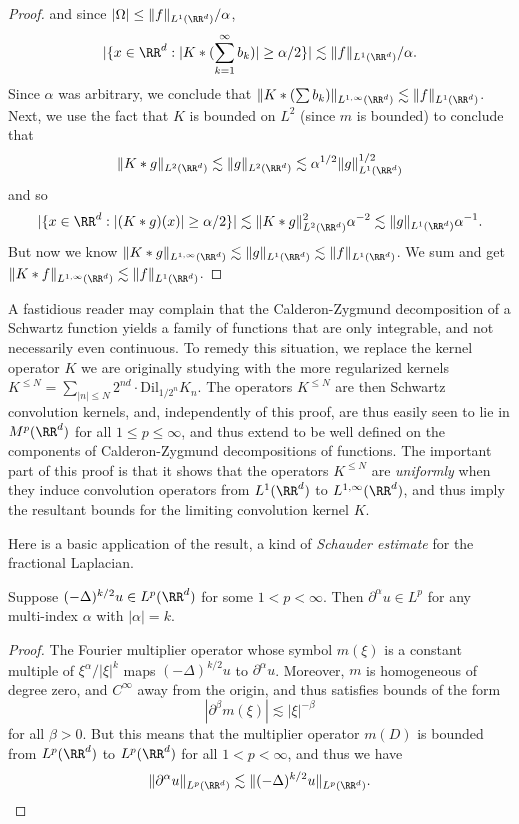 \begin{proof}
  and since $|\Omega| \leq \| f \|_{L^1(\RR^d)} / \alpha$,
  \[ |\{ x \in \RR^d : |K * (\sum_{k = 1}^\infty b_k)| \geq \alpha/2 \}| \lesssim \| f \|_{L^1(\RR^d)} / \alpha. \]
  Since $\alpha$ was arbitrary, we conclude that $\| K * (\sum b_k) \|_{L^{1,\infty}(\RR^d)} \lesssim \| f \|_{L^1(\RR^d)}$. Next, we use the fact that $K$ is bounded on $L^2$ (since $m$ is bounded) to conclude that
  \[ \| K * g \|_{L^2(\RR^d)} \lesssim \| g \|_{L^2(\RR^d)} \lesssim \alpha^{1/2} \| g \|_{L^1(\RR^d)}^{1/2} \]
  and so
  \[ |\{ x \in \RR^d: |(K * g)(x)| \geq \alpha / 2 \}| \lesssim \| K * g \|_{L^2(\RR^d)}^2 \alpha^{-2} \lesssim \| g \|_{L^1(\RR^d)} \alpha^{-1}. \]
  But now we know $\| K * g \|_{L^{1,\infty}(\RR^d)} \lesssim \| g \|_{L^1(\RR^d)} \lesssim \| f \|_{L^1(\RR^d)}$. We sum and get $\| K * f \|_{L^{1,\infty}(\RR^d)} \lesssim \| f \|_{L^1(\RR^d)}$.
\end{proof}

\begin{remark}
    A fastidious reader may complain that the Calderon-Zygmund decomposition of a Schwartz function yields a family of functions that are only integrable, and not necessarily even continuous. To remedy this situation, we replace the kernel operator $K$ we are originally studying with the more regularized kernels $K^{\leq N} = \sum_{|n| \leq N} 2^{nd} \cdot \text{Dil}_{1/2^n} K_n$. The operators $K^{\leq N}$ are then Schwartz convolution kernels, and, independently of this proof, are thus easily seen to lie in $M^p(\RR^d)$ for all $1 \leq p \leq \infty$, and thus extend to be well defined on the components of Calderon-Zygmund decompositions of functions. The important part of this proof is that it shows that the operators $K^{\leq N}$ are \emph{uniformly} when they induce convolution operators from $L^1(\RR^d)$ to $L^{1,\infty}(\RR^d)$, and thus imply the resultant bounds for the limiting convolution kernel $K$.
\end{remark}

Here is a basic application of the result, a kind of \emph{Schauder estimate} for the fractional Laplacian.

\begin{theorem}
    Suppose $(- \Delta)^{k/2} u \in L^p(\RR^d)$ for some $1 < p < \infty$. Then $\partial^\alpha u \in L^p$ for any multi-index $\alpha$ with $|\alpha| = k$.
\end{theorem}
\begin{proof}
    The Fourier multiplier operator whose symbol $m(\xi)$ is a constant multiple of $\xi^\alpha / |\xi|^k$ maps $(-\Delta)^{k/2} u$ to $\partial^\alpha u$. Moreover, $m$ is homogeneous of degree zero, and $C^\infty$ away from the origin, and thus satisfies bounds of the form
    \[ |\partial^\beta m(\xi)| \lesssim |\xi|^{-\beta} \]
    for all $\beta > 0$. But this means that the multiplier operator $m(D)$ is bounded from $L^p(\RR^d)$ to $L^p(\RR^d)$ for all $1 < p < \infty$, and thus we have
    \[ \| \partial^\alpha u \|_{L^p(\RR^d)} \lesssim \| (-\Delta)^{k/2} u \|_{L^p(\RR^d)}. \qedhere \]
\end{proof}

